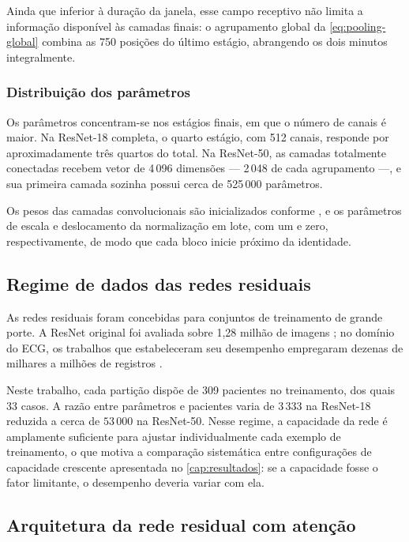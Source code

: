 Ainda que inferior à duração da janela, esse campo receptivo não limita a
informação disponível às camadas finais: o agrupamento global da
\autoref{eq:pooling-global} combina as 750 posições do último estágio,
abrangendo os dois minutos integralmente.

\subsubsection{Distribuição dos parâmetros}
\label{subsubsec:fund-resnet-parametros}

Os parâmetros concentram-se nos estágios finais, em que o número de canais é
maior. Na ResNet-18 completa, o quarto estágio, com 512 canais, responde por
aproximadamente três quartos do total. Na ResNet-50, as camadas totalmente conectadas recebem
vetor de 4\,096 dimensões --- 2\,048 de cada agrupamento ---, e sua primeira
camada sozinha possui cerca de 525\,000 parâmetros.

Os pesos das camadas convolucionais são inicializados conforme
, e os parâmetros de escala e deslocamento da
normalização em lote, com um e zero, respectivamente, de modo que cada bloco
inicie próximo da identidade.

\subsection{Regime de dados das redes residuais}
\label{subsec:fund-resnet-regime}

As redes residuais foram concebidas para conjuntos de treinamento de grande
porte. A ResNet original foi avaliada sobre 1,28 milhão de imagens
\cite{he2016deep}; no domínio do \gls{ECG}, os trabalhos que estabeleceram
seu desempenho empregaram dezenas de milhares a milhões de registros
\cite{hannun2019cardiologist,ribeiro2020automatic}.

Neste trabalho, cada partição dispõe de 309 pacientes no treinamento, dos
quais 33 casos. A razão entre parâmetros e pacientes varia de $3\,333$ na
ResNet-18 reduzida a cerca de $53\,000$ na ResNet-50. Nesse regime, a
capacidade da rede é amplamente suficiente para ajustar individualmente cada
exemplo de treinamento, o que motiva a comparação sistemática entre
configurações de capacidade crescente apresentada no
\autoref{cap:resultados}: se a capacidade fosse o fator limitante, o
desempenho deveria variar com ela.


\subsection{Arquitetura da rede residual com atenção}
\label{subsec:fund-atencao-arquitetura}

